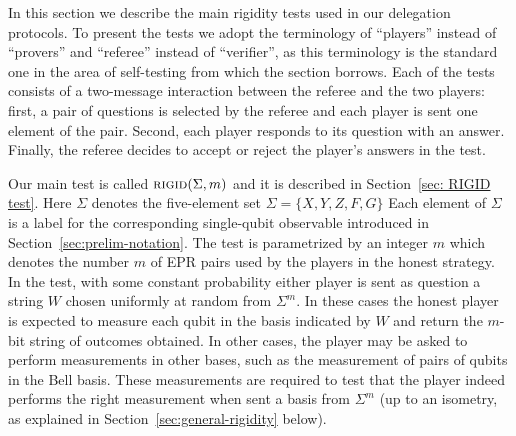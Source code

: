 \documentclass[11pt]{article}
\newcommand{\rigid}{\textsc{rigid}}
\begin{document}
In this section we describe the main rigidity tests used in our delegation protocols. To present the tests we adopt the terminology of ``players'' instead of ``provers'' and ``referee'' instead of ``verifier'', as this terminology is the standard one in the area of self-testing from which the section borrows. Each of the tests consists of a two-message interaction between the referee and the two players: first, a pair of questions is selected by the referee and each player is sent one element of the pair. Second, each player responds to its question with an answer. Finally, the referee decides to accept or reject the player's answers in the test. 

Our main test is called $\rigid(\Sigma,m)$ and it is described in Section~\ref{sec: RIGID test}. Here $\Sigma$ denotes the five-element set $\Sigma = \{X,Y,Z,F,G\}$ Each element of $\Sigma$ is a label for the corresponding single-qubit observable introduced in Section~\ref{sec:prelim-notation}. The test is parametrized by an integer $m$ which denotes the number $m$ of EPR pairs used by the players in the honest strategy. In the test, with some constant probability either player is sent as question a string $W$ chosen uniformly at random from $\Sigma^m$. In these cases the honest player is expected to measure each qubit in the basis indicated by $W$ and return the $m$-bit string of outcomes obtained. In other cases, the player may be asked to perform measurements in other bases, such as the measurement of pairs of qubits in the Bell basis. These measurements are required to test that the player indeed performs the right measurement when sent a basis from $\Sigma^m$ (up to an isometry, as explained in Section~\ref{sec:general-rigidity} below). 
\end{document}
